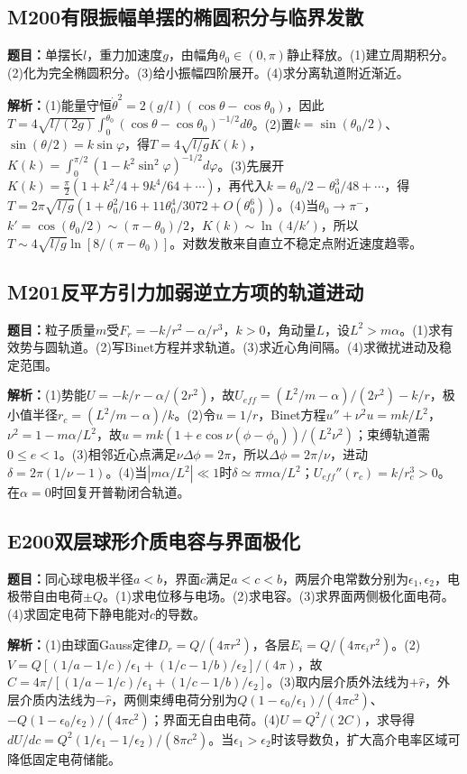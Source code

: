 \subsection*{M200\quad 有限振幅单摆的椭圆积分与临界发散}
\textbf{题目：}单摆长$l$，重力加速度$g$，由幅角$\theta_0\in(0,\pi)$静止释放。(1)建立周期积分。(2)化为完全椭圆积分。(3)给小振幅四阶展开。(4)求分离轨道附近渐近。
\par\textbf{解析：}(1)能量守恒$\dot\theta^2=2(g/l)(\cos\theta-\cos\theta_0)$，因此$T=4\sqrt{l/(2g)}\int_0^{\theta_0}(\cos\theta-\cos\theta_0)^{-1/2}d\theta$。(2)置$k=\sin(\theta_0/2)$、$\sin(\theta/2)=k\sin\varphi$，得$T=4\sqrt{l/g}K(k)$，$K(k)=\int_0^{\pi/2}(1-k^2\sin^2\varphi)^{-1/2}d\varphi$。(3)先展开$K(k)=\frac\pi2(1+k^2/4+9k^4/64+\cdots)$，再代入$k=\theta_0/2-\theta_0^3/48+\cdots$，得$T=2\pi\sqrt{l/g}(1+\theta_0^2/16+11\theta_0^4/3072+O(\theta_0^6))$。(4)当$\theta_0\to\pi^-$，$k'=\cos(\theta_0/2)\sim(\pi-\theta_0)/2$，$K(k)\sim\ln(4/k')$，所以$T\sim4\sqrt{l/g}\ln[8/(\pi-\theta_0)]$。对数发散来自直立不稳定点附近速度趋零。
\par\medskip
\subsection*{M201\quad 反平方引力加弱逆立方项的轨道进动}
\textbf{题目：}粒子质量$m$受$F_r=-k/r^2-\alpha/r^3$，$k>0$，角动量$L$，设$L^2>m\alpha$。(1)求有效势与圆轨道。(2)写Binet方程并求轨道。(3)求近心角间隔。(4)求微扰进动及稳定范围。
\par\textbf{解析：}(1)势能$U=-k/r-\alpha/(2r^2)$，故$U_{eff}=(L^2/m-\alpha)/(2r^2)-k/r$，极小值半径$r_c=(L^2/m-\alpha)/k$。(2)令$u=1/r$，Binet方程$u''+\nu^2u=mk/L^2$，$\nu^2=1-m\alpha/L^2$，故$u=mk(1+e\cos\nu(\phi-\phi_0))/(L^2\nu^2)$；束缚轨道需$0\le e<1$。(3)相邻近心点满足$\nu\Delta\phi=2\pi$，所以$\Delta\phi=2\pi/\nu$，进动$\delta=2\pi(1/\nu-1)$。(4)当$|m\alpha/L^2|\ll1$时$\delta\simeq\pi m\alpha/L^2$；$U_{eff}''(r_c)=k/r_c^3>0$。在$\alpha=0$时回复开普勒闭合轨道。
\par\medskip
\subsection*{E200\quad 双层球形介质电容与界面极化}
\textbf{题目：}同心球电极半径$a<b$，界面$c$满足$a<c<b$，两层介电常数分别为$\epsilon_1,\epsilon_2$，电极带自由电荷$\pm Q$。(1)求电位移与电场。(2)求电容。(3)求界面两侧极化面电荷。(4)求固定电荷下静电能对$c$的导数。
\par\textbf{解析：}(1)由球面Gauss定律$D_r=Q/(4\pi r^2)$，各层$E_i=Q/(4\pi\epsilon_i r^2)$。(2)$V=Q[(1/a-1/c)/\epsilon_1+(1/c-1/b)/\epsilon_2]/(4\pi)$，故$C=4\pi/[(1/a-1/c)/\epsilon_1+(1/c-1/b)/\epsilon_2]$。(3)取内层介质外法线为$+\hat r$，外层介质内法线为$-\hat r$，两侧束缚电荷分别为$Q(1-\epsilon_0/\epsilon_1)/(4\pi c^2)$、$-Q(1-\epsilon_0/\epsilon_2)/(4\pi c^2)$；界面无自由电荷。(4)$U=Q^2/(2C)$，求导得$dU/dc=Q^2(1/\epsilon_1-1/\epsilon_2)/(8\pi c^2)$。当$\epsilon_1>\epsilon_2$时该导数负，扩大高介电率区域可降低固定电荷储能。
\par\medskip
